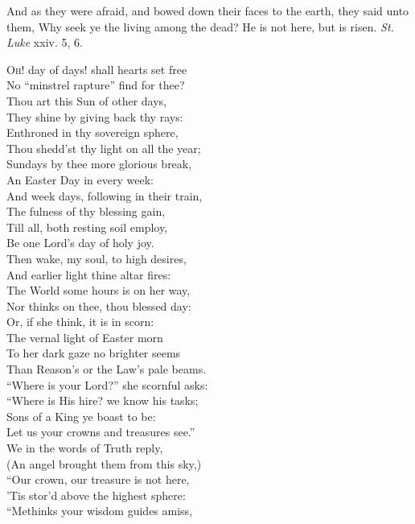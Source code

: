 
And as they were afraid, and bowed down their faces to the earth, they said unto them, Why seek ye the living among the dead? He is not here, but is risen. \emph{St. Luke} xxiv. 5, 6.

\textsc{Oh}! day of days! shall hearts set free \\
 No “minstrel rapture” find for thee? \\
 Thou art this Sun of other days, \\
 They shine by giving back thy rays: \\
  Enthroned in thy sovereign sphere, \\
 Thou shedd’st thy light on all the year; \\
 Sundays by thee more glorious break, \\
 An Easter Day in every week: \\
  And week days, following in their train, \\
 The fulness of thy blessing gain, \\
 Till all, both resting soil employ, \\
 Be one Lord’s day of holy joy. \\
  Then wake, my soul, to high desires, \\
 And earlier light thine altar fires: \\
 The World some hours is on her way, \\
 Nor thinks on thee, thou blessed day: \\
  Or, if she think, it is in scorn: \\
 The vernal light of Easter morn \\
 To her dark gaze no brighter seems \\
 Than Reason’s or the Law’s pale beams. \\
  “Where is your Lord?” she scornful asks: \\
 “Where is His hire? we know his tasks; \\
 Sons of a King ye boast to be: \\
 Let us your crowns and treasures see.” \\
  We in the words of Truth reply, \\
 (An angel brought them from this sky,) \\
 “Our crown, our treasure is not here, \\
 ’Tis stor’d above the highest sphere: \\
  “Methinks your wisdom guides amiss, \\
